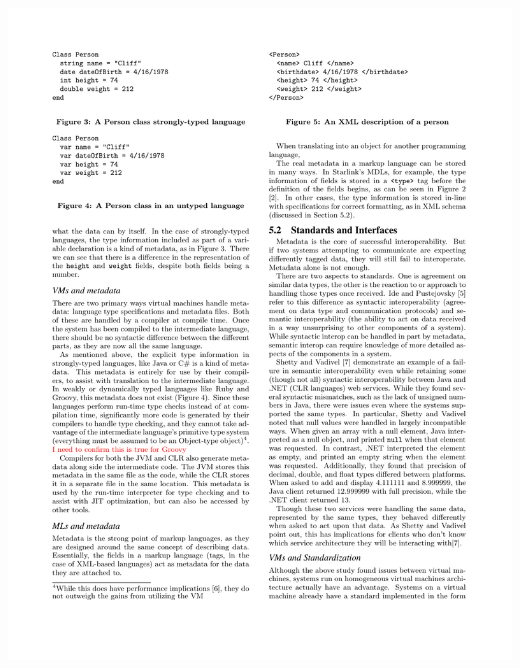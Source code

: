 \documentclass{beamer}
\begin{document}
\begin{frame}
\begin{columns}
  \begin{column}{0.5\textwidth}
  \includegraphics[scale=1]{graphics/StrongTypeCliff.pdf}
  

\end{column}
\end{columns}
\end{frame}
\end{document}
